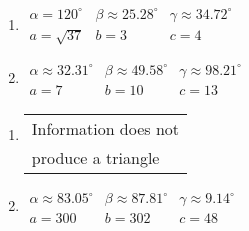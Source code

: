 \documentclass{ximera}
\begin{document}
\begin{multicols}{2} 

\begin{enumerate}

\setcounter{enumi}{\value{HW}}

\item $\begin{array}{lll}
\alpha = 120^{\circ} & \beta \approx 25.28^{\circ} & \gamma \approx 34.72^{\circ} \\
a = \sqrt{37} & b = 3 & c = 4 \end{array}$

\item $\begin{array}{lll}
\alpha \approx 32.31^{\circ} & \beta \approx 49.58^{\circ} & \gamma \approx 98.21^{\circ} \\
a = 7 & b = 10 & c = 13 \end{array}$

\setcounter{HW}{\value{enumi}}

\end{enumerate}

\end{multicols}

\begin{multicols}{2} 

\begin{enumerate}

\setcounter{enumi}{\value{HW}}

\item \begin{tabular}{l}
Information does not \\
produce a triangle \end{tabular}

\item $\begin{array}{lll}
\alpha \approx 83.05^{\circ} & \beta \approx 87.81^{\circ} & \gamma \approx 9.14^{\circ} \\
a = 300 & b = 302 & c = 48 \end{array}$

\setcounter{HW}{\value{enumi}}

\end{enumerate}

\end{multicols}
\end{document}
